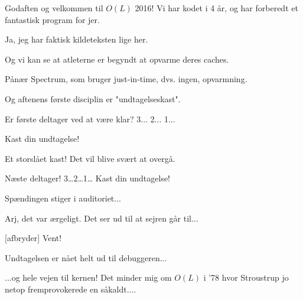 \documentclass[a4paper,11pt]{article}
\begin{document}
\begin{sketch}



   Godaften og velkommen til $O(L)$ 2016! Vi har kodet i 4 år, og har
  forberedt et fantastisk program for jer.

   Ja, jeg har faktisk kildeteksten lige her.

   Og vi kan se at atleterne er begyndt at opvarme deres caches.

   Pånær Spectrum, som bruger just-in-time, dvs. ingen, opvarmning.

   Og aftenens første disciplin er "undtagelseskast".


   Er første deltager ved at være klar? 3... 2... 1...

   Kast din undtagelse!


   Et storslået kast!  Det vil blive svært at overgå.

   Næste deltager! 3\ldots 2\ldots 1\ldots
   Kast din undtagelse!


   Spændingen stiger i auditoriet...


   Arj, det var ærgeligt.  Det ser ud til at sejren går til...

  [afbryder] Vent!


   Undtagelsen er nået helt ud til debuggeren...


   ...og hele vejen til kernen!  Det minder mig om $O(L)$ i
  '78 hvor Stroustrup jo netop fremprovokerede en såkaldt....


\end{sketch}
\end{document}
